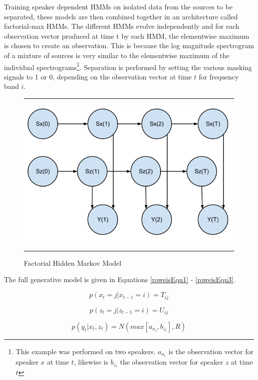 \documentclass[11pt, oneside, a4paper]{article}
\begin{document}
Training speaker dependent HMMs on isolated data from the sources to be separated, these models are then combined together in an architecture called factorial-max HMMs. The different HMMs evolve independently and for each observation vector produced at time t by each HMM, the elementwise maximum is chosen to create an observation. This is because the log magnitude spectrogram of a mixture of sources is very similar to the elementwise maximum of the individual spectrograms\footnote{This example was performed on two speakers. $a_{x_{t}}$ is the observation vector for speaker $x$ at time $t$, likewise is $b_{z_{t}}$ the observation vector for speaker $z$ at time $t$}. Separation is performed by setting the various masking signals to 1 or 0, depending on the observation vector at time $t$ for frequency band $i$.

\begin{figure}[h]
  \centering
  \hrule
  \includegraphics[width = .9\textwidth]{f_hmm}
  \hrule
  \caption{Factorial Hidden Markov Model}
  \label{fhmm_figure}
\end{figure}

The full generative model is given in Equations \ref{roweisEqn1} - \ref{roweisEqn3}.

\begin{equation}\label{roweisEqn1}
  p(x_{t}=j|x_{t-1}=i)=T_{ij}
\end{equation}

\begin{equation}\label{roweisEqn2}
  p(z_{t}=j|z_{t-1}=i)=U_{ij}  
\end{equation}

\begin{equation}\label{roweisEqn3}
  p(y_{t}|x_{t},z_{t})=N(max[a_{x_{t}},b_{z_{t}}], R)  
\end{equation}
\end{document}
